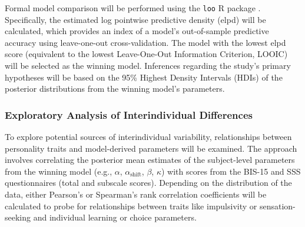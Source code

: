 Formal model comparison will be performed using the \texttt{loo} R package \citep{vehtari_practical_2017}. Specifically, the estimated log pointwise predictive density (elpd) will be calculated, which provides an index of a model's out-of-sample predictive accuracy using leave-one-out cross-validation. The model with the lowest elpd score (equivalent to the lowest Leave-One-Out Information Criterion, LOOIC) will be selected as the winning model. Inferences regarding the study's primary hypotheses will be based on the 95\% Highest Density Intervals (HDIs) of the posterior distributions from the winning model's parameters.

\subsubsection{Exploratory Analysis of Interindividual Differences}

To explore potential sources of interindividual variability, relationships between personality traits and model-derived parameters will be examined. The approach involves correlating the posterior mean estimates of the subject-level parameters from the winning model (e.g., $\alpha$, $\alpha_{\text{shift}}$, $\beta$, $\kappa$) with scores from the BIS-15 and SSS questionnaires (total and subscale scores). Depending on the distribution of the data, either Pearson's or Spearman's rank correlation coefficients will be calculated to probe for relationships between traits like impulsivity or sensation-seeking and individual learning or choice parameters. 